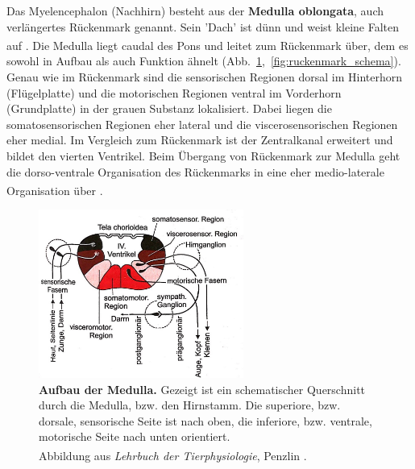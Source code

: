 \documentclass[12pt,a4paper,pdftex]{article}
\begin{document}
Das Myelencephalon (Nachhirn) besteht aus der \textbf{Medulla oblongata}, auch verlängertes Rückenmark genannt. Sein 'Dach' ist dünn und weist kleine Falten auf \textsuperscript{\cite[6]{storch2012lehrbuchzoo}}. Die Medulla liegt caudal des Pons und leitet zum Rückenmark über, dem es sowohl in Aufbau als auch Funktion ähnelt (Abb.~\ref{fig:medulla_schema},~\ref{fig:ruckenmark_schema}). Genau wie im Rückenmark sind die sensorischen Regionen dorsal im Hinterhorn (Flügelplatte) und die motorischen Regionen ventral im Vorderhorn (Grundplatte) in der grauen Substanz lokalisiert. Dabei liegen die somatosensorischen Regionen eher lateral und die viscerosensorischen Regionen eher medial. Im Vergleich zum Rückenmark ist der Zentralkanal erweitert und bildet den vierten Ventrikel. Beim Übergang von Rückenmark zur Medulla geht die dorso-ventrale Organisation des Rückenmarks in eine eher medio-laterale Organisation über \textsuperscript{\cite[14]{penzlin2005tierphys}}.

\begin{figure}[H]
    \centering
    \includegraphics[width=0.6\textwidth]{pictures/Bilder_Jule/Andere/medulla_schema.jpg}
    \caption[Aufbau der Medulla]{\textbf{Aufbau der Medulla.} Gezeigt ist ein schematischer Querschnitt durch die Medulla, bzw. den Hirnstamm. Die superiore, bzw. dorsale, sensorische Seite ist nach oben, die inferiore, bzw. ventrale, motorische Seite nach unten orientiert.\\
    Abbildung aus \textit{Lehrbuch der Tierphysiologie}, Penzlin {\textsuperscript{\cite[14]{penzlin2005tierphys}}}.}
    \label{fig:medulla_schema}
\end{figure}{}
\end{document}
